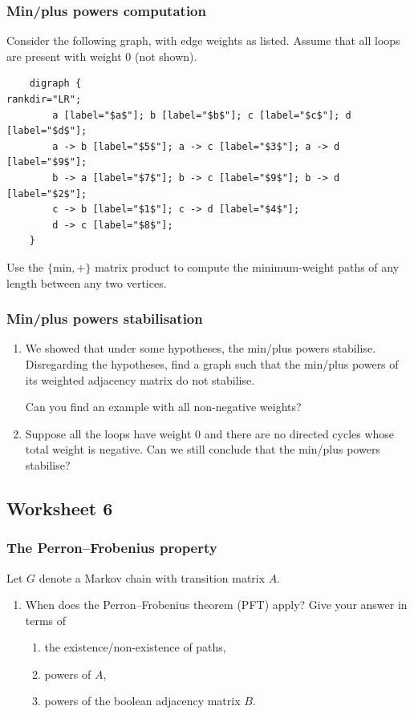 \documentclass{amsart}
\begin{document}
\subsubsection{Min/plus powers computation}
\label{sec:orgad726af}
Consider the following graph, with edge weights as listed.
Assume that all loops are present with weight 0 (not shown).
\begin{verbatim}
    digraph {
rankdir="LR";
        a [label="$a$"]; b [label="$b$"]; c [label="$c$"]; d [label="$d$"];
        a -> b [label="$5$"]; a -> c [label="$3$"]; a -> d [label="$9$"];
        b -> a [label="$7$"]; b -> c [label="$9$"]; b -> d [label="$2$"];
        c -> b [label="$1$"]; c -> d [label="$4$"];
        d -> c [label="$8$"];
    }
\end{verbatim}
\begin{center}

\label{orge51beb6}
\end{center}
Use the \(\{\text{min},+\}\) matrix product to compute the minimum-weight paths of any length between any two vertices.
\subsubsection{Min/plus powers stabilisation}
\label{sec:orgd2315bf}
\begin{enumerate}
\item We showed that under some hypotheses, the min/plus powers stabilise.
Disregarding the hypotheses, find a graph such that the min/plus powers of its weighted adjacency matrix do not stabilise.

Can you find an example with all non-negative weights?

\item Suppose all the loops have weight 0 and there are no directed cycles whose total weight is negative.
Can we still conclude that the min/plus powers stabilise?
\end{enumerate}
\subsection{Worksheet 6}
\label{sec:orgeed8715}
\togglefalse{solutions}
\subsubsection{The Perron--Frobenius property}
\label{sec:orgce8c08d}
Let \(G\) denote a Markov chain with transition matrix \(A\).

\begin{enumerate}
\item When does the Perron--Frobenius theorem (PFT) apply?
Give your answer in terms of 
\begin{enumerate}
\item the existence/non-existence of paths,
\item powers of \(A\),
\item powers of the boolean adjacency matrix \(B\).
\end{enumerate}
\end{enumerate}
\end{document}
